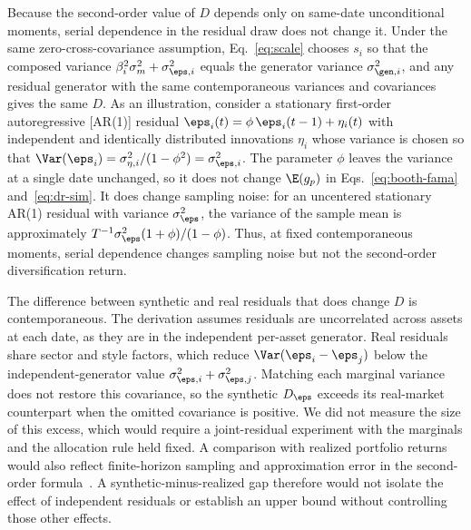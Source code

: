 Because the second-order value of $D$ depends only on same-date
unconditional moments, serial dependence in the residual draw does not
change it. Under the same zero-cross-covariance assumption,
Eq.~\eqref{eq:scale} chooses $s_i$ so that the composed variance $\beta_i^2\sigma_m^2+\sigma_{\eps,i}^2$ equals the
generator variance $\sigma_{\gen,i}^2$, and any residual generator
with the same contemporaneous variances and covariances gives the same $D$. As an
illustration, consider a stationary first-order autoregressive
[AR(1)] residual $\eps_i(t) = \phi\, \eps_i(t-1) + \eta_i(t)$ with
independent and identically distributed innovations $\eta_i$ whose
variance is chosen so that
$\Var(\eps_i) = \sigma_{\eta,i}^2 / (1 - \phi^2) = \sigma_{\eps,i}^2$.
The parameter $\phi$ leaves the variance at a single date unchanged,
so it does not change $\E(g_p)$ in Eqs.~\eqref{eq:booth-fama}
and~\eqref{eq:dr-sim}. It does change sampling noise: for an
uncentered stationary AR(1) residual with variance $\sigma_\eps^2$,
the variance of the sample mean is approximately
$T^{-1}\sigma_\eps^2(1+\phi)/(1-\phi)$. Thus, at fixed contemporaneous moments, serial dependence changes
sampling noise but not the second-order diversification return.

The difference between synthetic and real residuals that does change
$D$ is contemporaneous. The derivation assumes residuals are
uncorrelated across assets at each date, as they are in the
independent per-asset generator. Real residuals share sector and style
factors, which reduce $\Var(\eps_i-\eps_j)$ below the
independent-generator value $\sigma_{\eps,i}^2+\sigma_{\eps,j}^2$.
Matching each marginal variance does not restore this covariance, so
the synthetic $D_\eps$ exceeds its real-market counterpart when the
omitted covariance is positive. We did not measure the size of this
excess, which would require a joint-residual experiment with the
marginals and the allocation rule held fixed. A comparison with realized portfolio returns would also reflect
finite-horizon sampling and approximation error in the second-order
formula~\cite{boucheyNemtchinovWong2015}. A synthetic-minus-realized
gap therefore would not isolate the effect of independent residuals
or establish an upper bound without controlling those other effects.



